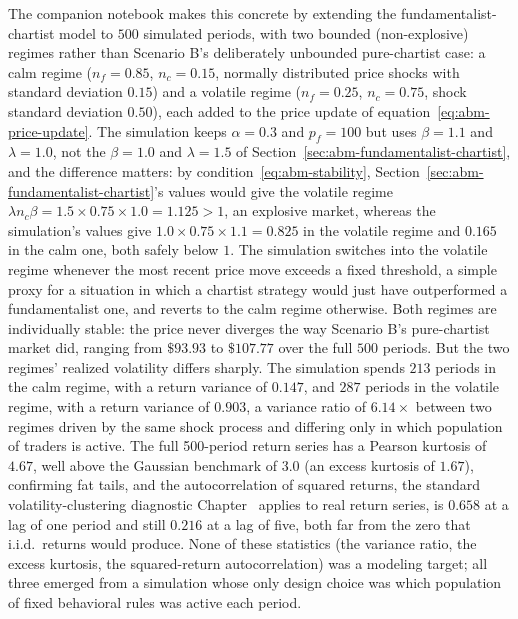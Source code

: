 \documentclass[../ai_in_finance]{subfiles}
\begin{document}
The companion notebook makes this concrete by extending the fundamentalist-chartist model to $500$ simulated periods, with two bounded (non-explosive) regimes rather than Scenario B's deliberately unbounded pure-chartist case: a calm regime ($n_f=0.85$, $n_c=0.15$, normally distributed price shocks with standard deviation $0.15$) and a volatile regime ($n_f=0.25$, $n_c=0.75$, shock standard deviation $0.50$), each added to the price update of equation~\eqref{eq:abm-price-update}. The simulation keeps $\alpha=0.3$ and $p_f=100$ but uses $\beta=1.1$ and $\lambda=1.0$, not the $\beta=1.0$ and $\lambda=1.5$ of Section~\ref{sec:abm-fundamentalist-chartist}, and the difference matters: by condition~\eqref{eq:abm-stability}, Section~\ref{sec:abm-fundamentalist-chartist}'s values would give the volatile regime $\lambda n_c\beta = 1.5\times0.75\times1.0 = 1.125 > 1$, an explosive market, whereas the simulation's values give $1.0\times0.75\times1.1 = 0.825$ in the volatile regime and $0.165$ in the calm one, both safely below $1$. The simulation switches into the volatile regime whenever the most recent price move exceeds a fixed threshold, a simple proxy for a situation in which a chartist strategy would just have outperformed a fundamentalist one, and reverts to the calm regime otherwise. Both regimes are individually stable: the price never diverges the way Scenario B's pure-chartist market did, ranging from $\$93.93$ to $\$107.77$ over the full $500$ periods. But the two regimes' realized volatility differs sharply. The simulation spends $213$ periods in the calm regime, with a return variance of $0.147$, and $287$ periods in the volatile regime, with a return variance of $0.903$, a variance ratio of $6.14\times$ between two regimes driven by the same shock process and differing only in which population of traders is active. The full 500-period return series has a Pearson kurtosis of $4.67$, well above the Gaussian benchmark of $3.0$ (an excess kurtosis of $1.67$), confirming fat tails, and the autocorrelation of squared returns, the standard volatility-clustering diagnostic Chapter~ applies to real return series, is $0.658$ at a lag of one period and still $0.216$ at a lag of five, both far from the zero that i.i.d.\ returns would produce. None of these statistics (the variance ratio, the excess kurtosis, the squared-return autocorrelation) was a modeling target; all three emerged from a simulation whose only design choice was which population of fixed behavioral rules was active each period.
\end{document}
